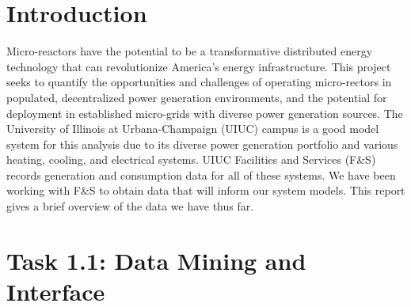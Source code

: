 \section*{Introduction}
Micro-reactors have the potential to be a transformative distributed energy technology that can revolutionize America's energy infrastructure.
This project seeks to quantify the opportunities and challenges of operating micro-rectors in populated, decentralized power generation environments, and the potential for deployment in established micro-grids with diverse power generation sources.
The University of Illinois at Urbana-Champaign (UIUC) campus is a good model system for this analysis due to its diverse power generation portfolio and various heating, cooling, and electrical systems.
UIUC Facilities and Services (F\&S) records generation and consumption data for all of these systems. We have been working with F\&S to obtain data that will inform our system models. This report gives a brief overview of the data we have thus far.



\section{Task 1.1: Data Mining and Interface}

